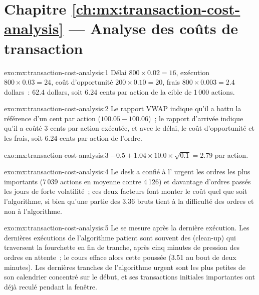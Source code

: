 \section*{Chapitre \ref{ch:mx:transaction-cost-analysis} --- Analyse des coûts de transaction}

\begin{solution}{exo:mx:transaction-cost-analysis:1}
Délai $800\times0.02=16$, exécution $800\times0.03=24$, coût d'opportunité $200\times0.10=20$, frais $800\times0.003=2.4$ dollars~: 62.4 dollars, soit 6.24 cents
par action de la cible de 1\,000 actions.
\end{solution}

\begin{solution}{exo:mx:transaction-cost-analysis:2}
Le rapport VWAP indique qu'il a battu la référence d'un cent par action ($100.05-100.06$)~; le rapport d'arrivée indique qu'il a coûté 3 cents par action exécutée, et avec le délai,
le coût d'opportunité et les frais, soit 6.24 cents par action de l'ordre.
\end{solution}

\begin{solution}{exo:mx:transaction-cost-analysis:3}
$-0.5+1.04\times10.0\times\sqrt{0.1}=2.79$  par action.
\end{solution}

\begin{solution}{exo:mx:transaction-cost-analysis:4}
Le desk a confié à l' urgent les ordres les plus importants (7\,039 actions en moyenne contre 4\,126) et davantage d'ordres passés les jours de forte volatilité~; ces deux facteurs font monter le
coût quel que soit l'algorithme, si bien qu'une partie des 3.36  bruts tient à la difficulté des ordres et non à l'algorithme.
\end{solution}

\begin{solution}{exo:mx:transaction-cost-analysis:5}
Le  se mesure après la dernière exécution. Les dernières exécutions de l'algorithme patient sont souvent des  (clean-up) qui traversent la fourchette en fin de tranche,
après cinq minutes de pression des ordres en attente~; le cours efface alors cette poussée (3.51  au bout de deux minutes). Les dernières tranches de l'algorithme urgent sont les
plus petites de son calendrier concentré sur le début, et ses transactions initiales importantes ont déjà reculé pendant la fenêtre.
\end{solution}

